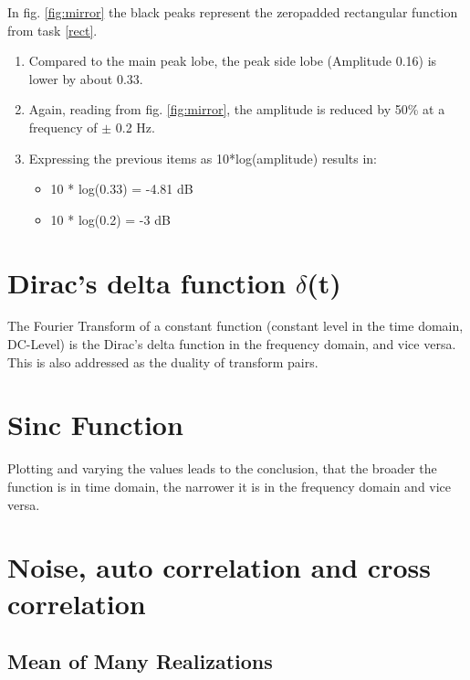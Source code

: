 \documentclass[12pt]{article}
\begin{document}
In fig. \ref{fig:mirror} the black peaks represent the zeropadded rectangular function from task \ref{rect}.

\begin{enumerate}[label=\alph*)]
	\item Compared to the main peak lobe, the peak side lobe (Amplitude 0.16) is lower by about 0.33.
	\item Again, reading from fig. \ref{fig:mirror}, the amplitude is reduced by 50\% at a frequency of $\pm$ 0.2 Hz.
	\item Expressing the previous items as 10*log(amplitude) results in: 
	\begin{itemize}
		\item 10 * log(0.33) = -4.81 dB
		\item 10 * log(0.2)  = -3 dB
	\end{itemize}
\end{enumerate}


\section{Dirac’s delta function $\delta$(t)}
The Fourier Transform of a constant function (constant level in the time domain, DC-Level) is the Dirac's delta function in the frequency domain, and vice versa. This is also addressed as the duality of transform pairs.


\section{Sinc Function}

Plotting and varying the values leads to the conclusion, that the broader the function is in time domain, the narrower it is in the frequency domain and vice versa.


\section{Noise, auto correlation and cross correlation}
\subsection{Mean of Many Realizations}
\end{document}
